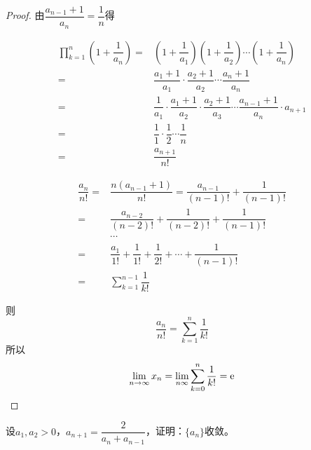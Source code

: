 \begin{proof}

    由$\dfrac{a_{n-1}+1}{a_n} = \dfrac{1}{n}$得

    \begin{align*}
        \prod_{k=1}^{n}{(1+\dfrac{1}{a_n})} = & (1+\dfrac{1}{a_1}) (1+\dfrac{1}{a_2}) \cdots (1+\dfrac{1}{a_n}) \\
        = & \dfrac{a_1 + 1}{a_1} \cdot \dfrac{a_2 + 1}{a_2} \cdots \dfrac{a_n + 1}{a_n} \\
        = & \dfrac{1}{a_1} \cdot \dfrac{a_1 + 1}{a_2} \cdot \dfrac{a_2 + 1}{a_3} \cdots \dfrac{a_{n-1} + 1}{a_n} \cdot a_{n+1} \\
        = & \dfrac{1}{1} \cdot \dfrac{1}{2} \cdots \dfrac{1}{n} \\
        = &\dfrac{a_{n+1}}{n!} 
    \end{align*}

    \begin{align*}
        \dfrac{a_n}{n!} = & \dfrac{n(a_{n-1}+1)}{n!} = \dfrac{a_{n-1}}{(n-1)!} + \dfrac{1}{(n-1)!} \\
        = & \dfrac{a_{n-2}}{(n-2)!} + \dfrac{1}{(n-2)!} + \dfrac{1}{(n-1)!} \\
        & \cdots \\ 
        = & \dfrac{a_1}{1!} + \dfrac{1}{1!} + \dfrac{1}{2!} + \cdots + \dfrac{1}{(n-1)!} \\
        = & \sum_{k=1}^{n-1}{\dfrac{1}{k!}} 
    \end{align*}

    则
    $$\dfrac{a_n}{n!} = \sum\limits_{k=1}^{n}{\dfrac{1}{k!}}$$
    所以
    $$\lim_{n\to\infty}{x_n} = \lim_{n\infty}{\sum\limits_{k=0}^{n}{\dfrac{1}{k!}}} = \mathrm{e}$$

\end{proof}

\begin{proposition}

    设$a_1,a_2>0$，$a_{n+1} = \dfrac{2}{a_n + a_{n-1}}$，证明：$\{a_n\}$收敛。

\end{proposition}

